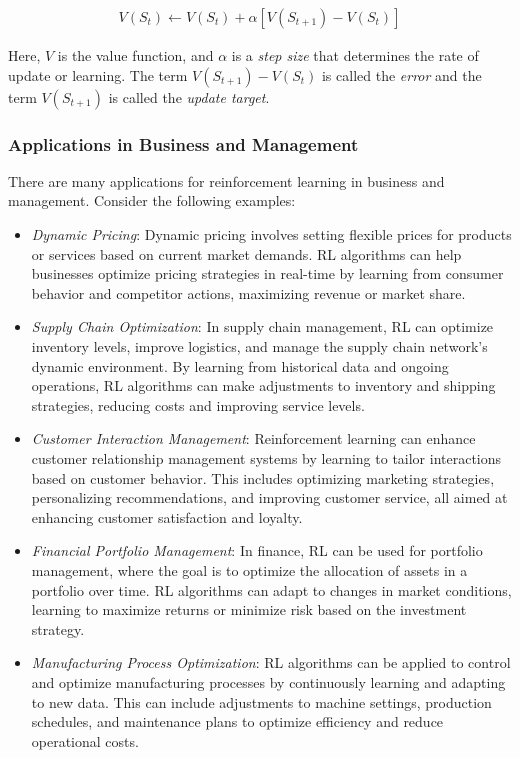 \begin{align}
V(S_t) \leftarrow V(S_t) + \alpha \left[ V(S_{t+1}) - V(S_t)\right] \label{eq:1}
\end{align}

Here, $V$ is the value function, and $\alpha$ is a \emph{step size} that determines the rate of update or learning. The term $V(S_{t+1}) - V(S_t)$ is called the \emph{error} and the term $V(S_{t+1})$ is called the \emph{update target}.

\subsubsection*{Applications in Business and Management}

There are many applications for reinforcement learning in business and management. Consider the following examples:

\begin{itemize}
\item \emph{Dynamic Pricing}: Dynamic pricing involves setting flexible prices for products or services based on current market demands. RL algorithms can help businesses optimize pricing strategies in real-time by learning from consumer behavior and competitor actions, maximizing revenue or market share.

\item \emph{Supply Chain Optimization}: In supply chain management, RL can optimize inventory levels, improve logistics, and manage the supply chain network's dynamic environment. By learning from historical data and ongoing operations, RL algorithms can make adjustments to inventory and shipping strategies, reducing costs and improving service levels.

\item \emph{Customer Interaction Management}: Reinforcement learning can enhance customer relationship management systems by learning to tailor interactions based on customer behavior. This includes optimizing marketing strategies, personalizing recommendations, and improving customer service, all aimed at enhancing customer satisfaction and loyalty.

\item \emph{Financial Portfolio Management}: In finance, RL can be used for portfolio management, where the goal is to optimize the allocation of assets in a portfolio over time. RL algorithms can adapt to changes in market conditions, learning to maximize returns or minimize risk based on the investment strategy.

\item \emph{Manufacturing Process Optimization}: RL algorithms can be applied to control and optimize manufacturing processes by continuously learning and adapting to new data. This can include adjustments to machine settings, production schedules, and maintenance plans to optimize efficiency and reduce operational costs.
\end{itemize}

